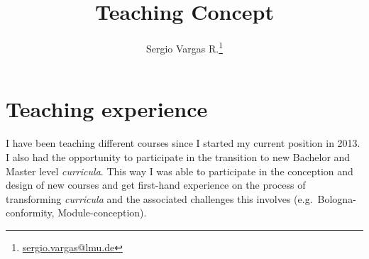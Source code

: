 \documentclass[a4paper,11pt]{article}
\makeatletter
\renewcommand{\maketitle}{\bgroup\setlength{\parindent}{0pt}
\begin{flushleft}
  \thispagestyle{plain}
  \textbf{\@title}

  \@author
\end{flushleft}\egroup
}
\renewenvironment{abstract}
 {\small
  \begin{flushleft}
  \textbf{\abstractname}\vspace{-0.40em}\vspace{0pt}
  \end{flushleft}
  \list{}{
    \setlength{\leftmargin}{0cm}%
    \setlength{\rightmargin}{\leftmargin}%
  }%
  \item\relax}
 {\endlist}
\makeatother
\begin{document}
\title{\Large Teaching Concept\newline}

\author[1]{Sergio Vargas R.\footnote[2]{\href{sergio.vargas@lmu.de}{sergio.vargas@lmu.de}}}


\date{}

\maketitle


\section*{Teaching experience}


I have been teaching different courses since I started my current position in 2013. I also had the opportunity to participate in the transition to new Bachelor and Master level \emph{curricula}. This way I was able to participate in the conception and design of new courses and get first-hand experience on the process of transforming \emph{curricula} and the associated challenges this involves (e.g.~Bologna-conformity, Module-conception).\\
\end{document}
